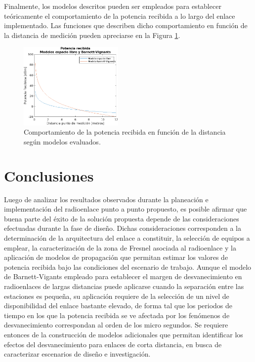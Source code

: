 \documentclass[conference]{IEEEtran}
\begin{document}
Finalmente, los modelos descritos pueden ser empleados para establecer teóricamente el comportamiento de la potencia 
recibida a lo largo del enlace implementado. Las funciones que describen dicho comportamiento en función de la distancia 
de medición pueden apreciarse en la Figura \ref{fig:Potencia_Modelos}. 
\begin{figure}
    \centering
          \includegraphics[width=0.45\textwidth]{Potencia_Modelos.png}
        \caption{Comportamiento de la potencia recibida en función de la distancia según modelos evaluados.
        }
        \label{fig:Potencia_Modelos}
\end{figure}
\section{Conclusiones}
Luego de analizar los resultados observados durante la planeación e implementación del radioenlace punto a punto propuesto,
es posible afirmar que buena parte del éxito de la solución propuesta depende de las consideraciones efectuadas durante la fase
de diseño. Dichas consideraciones corresponden a la determinación de la arquitectura del enlace a constituir, la selección de equipos a emplear, 
la caracterización de la zona de Fresnel asociada al radioenlace y la aplicación de modelos de propagación que permitan estimar 
los valores de potencia recibida bajo las condiciones del escenario de trabajo. Aunque el modelo de Barnett-Vigants empleado para establecer
el margen de desvanecimiento en radioenlaces de largas distancias puede aplicarse cuando la separación entre las estaciones es pequeña, su 
aplicación requiere de la selección de un nivel de disponibilidad del enlace bastante elevado, de forma tal que los periodos de tiempo
en los que la potencia recibida se ve afectada por los fenómenos de desvanecimiento correspondan al orden de los micro segundos. Se requiere
entonces de la construcción de modelos adicionales que permitan identificar los efectos del desvanecimiento para enlaces de corta distancia, en 
busca de caracterizar escenarios de diseño e investigación. 
\end{document}
